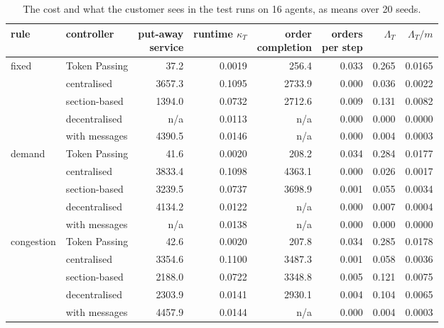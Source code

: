 \documentclass[11pt,a4paper]{article}
\newcommand{\new}[1]{\textcolor{newc}{#1}}
\begin{document}
\begin{table}[h]
  \centering
  \small
  \setlength{\tabcolsep}{4pt}
  \caption{\new{The cost and what the customer sees in the test runs on 16 agents, as means over 20 seeds.}}
  \label{tab:app:cost:16}
  \begin{tabular}{llrrrrrr}
    \toprule
    rule  &  controller  &  \shortstack{put-away\\service}  &  runtime $\kappa_T$  &  \shortstack{order\\completion}  &  \shortstack{orders\\per step}  &  $\Lambda_T$  &  $\Lambda_T/m$ \\
    \midrule
    fixed      & Token Passing  & 37.2 & 0.0019 & 256.4 & 0.033 & 0.265 & 0.0165 \\
               & centralised    & 3657.3 & 0.1095 & 2733.9 & 0.000 & 0.036 & 0.0022 \\
               & section-based  & 1394.0 & 0.0732 & 2712.6 & 0.009 & 0.131 & 0.0082 \\
               & decentralised  & n/a & 0.0113 & n/a & 0.000 & 0.000 & 0.0000 \\
               & with messages  & 4390.5 & 0.0146 & n/a & 0.000 & 0.004 & 0.0003 \\
    demand     & Token Passing  & 41.6 & 0.0020 & 208.2 & 0.034 & 0.284 & 0.0177 \\
               & centralised    & 3833.4 & 0.1098 & 4363.1 & 0.000 & 0.026 & 0.0017 \\
               & section-based  & 3239.5 & 0.0737 & 3698.9 & 0.001 & 0.055 & 0.0034 \\
               & decentralised  & 4134.2 & 0.0122 & n/a & 0.000 & 0.007 & 0.0004 \\
               & with messages  & n/a & 0.0138 & n/a & 0.000 & 0.000 & 0.0000 \\
    congestion & Token Passing  & 42.6 & 0.0020 & 207.8 & 0.034 & 0.285 & 0.0178 \\
               & centralised    & 3354.6 & 0.1100 & 3487.3 & 0.001 & 0.058 & 0.0036 \\
               & section-based  & 2188.0 & 0.0722 & 3348.8 & 0.005 & 0.121 & 0.0075 \\
               & decentralised  & 2303.9 & 0.0141 & 2930.1 & 0.004 & 0.104 & 0.0065 \\
               & with messages  & 4457.9 & 0.0144 & n/a & 0.000 & 0.004 & 0.0003 \\
    \bottomrule
  \end{tabular}
\end{table}
\end{document}
